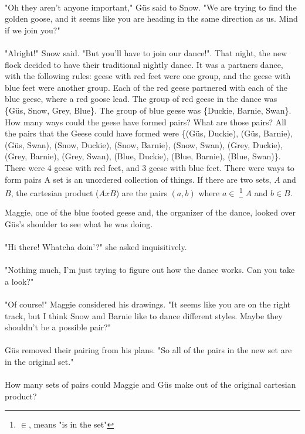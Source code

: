 \paragraph{} "Oh they aren't anyone important," Güs said to Snow. "We are trying to find the golden goose, and it seems like you are heading in the same direction as us. Mind if we join you?"
\paragraph{} "Alright!" Snow said. "But you'll have to join our dance!".
\vfill
\pagebreak
{}
{That night, the new flock decided to have their traditional nightly dance. It was a partners dance, with the following rules: geese with red feet were one group, and the geese with blue feet were another group. Each of the red geese partnered with each of the blue geese, where a red goose lead. The group of red geese in the dance was \{Güs, Snow, Grey, Blue\}. The group of blue geese was \{Duckie, Barnie, Swan\}. How many ways could the geese have formed pairs? What are those pairs?}
{All the pairs that the Geese could have formed were \{(Güs, Duckie), (Güs, Barnie), (Güs, Swan), (Snow, Duckie), (Snow, Barnie), (Snow, Swan), (Grey, Duckie), (Grey, Barnie), (Grey, Swan), (Blue, Duckie), (Blue, Barnie), (Blue, Swan)\}. There were 4 geese with red feet, and 3 geese with blue feet. There were  ways to form pairs}
{A set is an unordered collection of things. If there are two sets, $A$ and $B$, the cartesian product ($AxB$) are the pairs $(a, b)$ where $a\in$ \footnote{$\in$, means "is in the set"} $A$ and $b\in B$.}
{}
{Maggie, one of the blue footed geese and, the organizer of the dance, looked over Güs's shoulder to see what he was doing. \paragraph{} "Hi there! Whatcha doin'?" she asked inquisitively.
\paragraph{} "Nothing much, I'm just trying to figure out how the dance works. Can you take a look?"
\paragraph{} "Of course!" Maggie considered his drawings. "It seems like you are on the right track, but I think Snow and Barnie like to dance different styles. Maybe they shouldn't be a possible pair?"
\paragraph{} Güs removed their pairing from his plans. "So all of the pairs in the new set are in the original set."
\paragraph{} How many sets of pairs could Maggie and Güs make out of the original cartesian product?}
